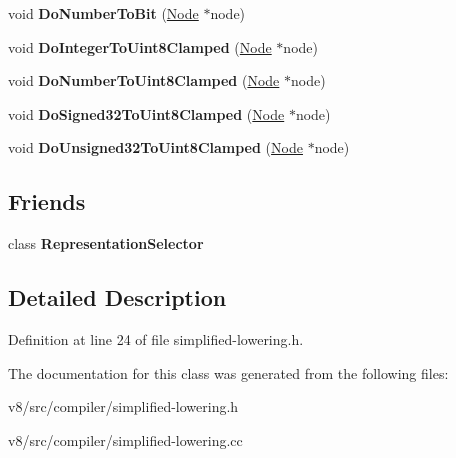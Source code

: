 \begin{DoxyCompactItemize}
void {\bfseries Do\+Number\+To\+Bit} (\mbox{\hyperlink{classv8_1_1internal_1_1compiler_1_1Node}{Node}} $\ast$node)
\item 
\mbox{\label{classv8_1_1internal_1_1compiler_1_1SimplifiedLowering_a1ec115d4213b22393173eb3fdc9ef0e6}} 
void {\bfseries Do\+Integer\+To\+Uint8\+Clamped} (\mbox{\hyperlink{classv8_1_1internal_1_1compiler_1_1Node}{Node}} $\ast$node)
\item 
\mbox{\label{classv8_1_1internal_1_1compiler_1_1SimplifiedLowering_a1272a0c080e80b78278543155cf828c8}} 
void {\bfseries Do\+Number\+To\+Uint8\+Clamped} (\mbox{\hyperlink{classv8_1_1internal_1_1compiler_1_1Node}{Node}} $\ast$node)
\item 
\mbox{\label{classv8_1_1internal_1_1compiler_1_1SimplifiedLowering_a8adfde1c76fee4e425db337c258e63d4}} 
void {\bfseries Do\+Signed32\+To\+Uint8\+Clamped} (\mbox{\hyperlink{classv8_1_1internal_1_1compiler_1_1Node}{Node}} $\ast$node)
\item 
\mbox{\label{classv8_1_1internal_1_1compiler_1_1SimplifiedLowering_a2b362ffac48c987676301b76a08d13b1}} 
void {\bfseries Do\+Unsigned32\+To\+Uint8\+Clamped} (\mbox{\hyperlink{classv8_1_1internal_1_1compiler_1_1Node}{Node}} $\ast$node)
\end{DoxyCompactItemize}
\subsection*{Friends}
\begin{DoxyCompactItemize}
\item 
\mbox{\label{classv8_1_1internal_1_1compiler_1_1SimplifiedLowering_ad8d54b364c13d0305a845ae6fcb97830}} 
class {\bfseries Representation\+Selector}
\end{DoxyCompactItemize}


\subsection{Detailed Description}


Definition at line 24 of file simplified-\/lowering.\+h.



The documentation for this class was generated from the following files\+:\begin{DoxyCompactItemize}
\item 
v8/src/compiler/simplified-\/lowering.\+h\item 
v8/src/compiler/simplified-\/lowering.\+cc\end{DoxyCompactItemize}
